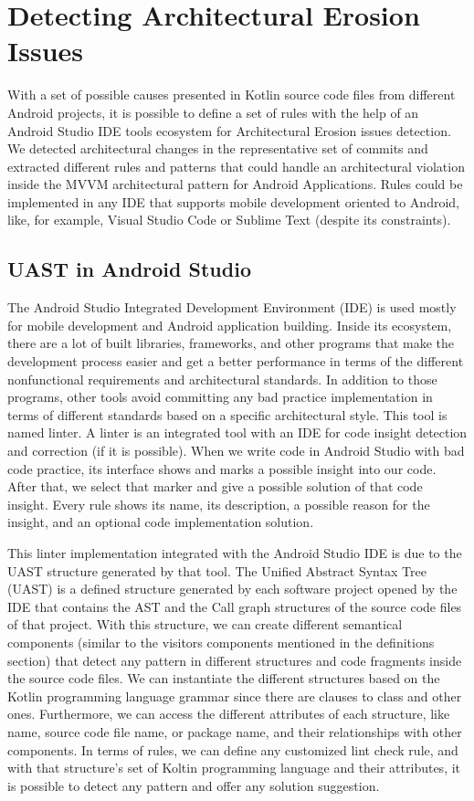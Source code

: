 \chapter{Detecting Architectural Erosion Issues}
\label{cha:detection}

With a set of possible causes presented in Kotlin source code files from different Android projects, it is possible to define a set of rules with the help of an Android Studio IDE tools ecosystem for Architectural Erosion issues detection. We detected architectural changes in the representative set of commits and extracted different rules and patterns that could handle an architectural violation inside the MVVM architectural pattern for Android Applications. Rules could be implemented in any IDE that supports mobile development oriented to Android, like, for example, Visual Studio Code or Sublime Text (despite its constraints).


\section{UAST in Android Studio}
The Android Studio  Integrated Development Environment (IDE) is used mostly for mobile development and Android application building. Inside its ecosystem, there are a lot of built libraries, frameworks, and other programs that make the development process easier and get a better performance in terms of the different nonfunctional requirements and architectural standards. In addition to those programs, other tools avoid committing any bad practice implementation in terms of different standards based on a specific architectural style. This tool is named linter. A linter is an integrated tool with an IDE for code insight detection and correction  (if it is possible). When we write code in Android Studio with bad code practice, its interface shows and marks a possible insight into our code. After that, we select that marker and give a possible solution of that code insight. Every rule shows its name, its description, a possible reason for the insight, and an optional code implementation solution.

This linter implementation integrated with the Android Studio IDE is due to the UAST structure generated by that tool. The Unified Abstract Syntax Tree (UAST) is a defined structure generated by each software project opened by the IDE that contains the AST and the Call graph structures of the source code files of that project. With this structure, we can create different semantical components (similar to the visitors components mentioned in the definitions section) that detect any pattern in different structures and code fragments inside the source code files. We can instantiate the different structures based on the Kotlin programming language grammar since there are clauses to class and other ones. Furthermore, we can access the different attributes of each structure, like name, source code file name, or package name, and their relationships with other components. In terms of rules, we can define any customized lint check rule, and with that structure's set of Koltin programming language and their attributes, it is possible to detect any pattern and offer any solution suggestion.

